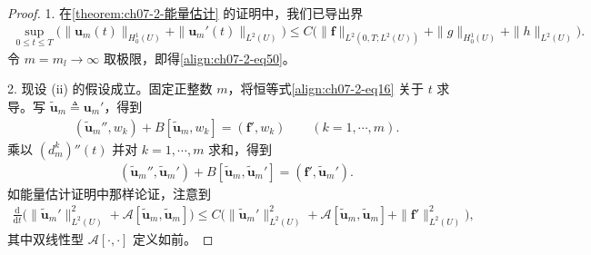 \documentclass[../../main.tex]{subfiles}
\begin{document}
\begin{proof}
1. 在\cref{theorem:ch07-2-能量估计} 的证明中，我们已导出界
\begin{align}
\sup_{0\leqslant t\leqslant T}\bigl(\|\mathbf{u}_m(t)\|_{H^1_0(U)}+\|\mathbf{u}_m'(t)\|_{L^2(U)}\bigr)
\leqslant C\bigl(\|\mathbf{f}\|_{L^2(0,T;L^2(U))}+\|g\|_{H^1_0(U)}+\|h\|_{L^2(U)}\bigr).\label{align:ch07-2-eq52}
\end{align}
令 $m=m_l\to\infty$ 取极限，即得\eqref{align:ch07-2-eq50}。

2. 现设 (ii) 的假设成立。固定正整数 $m$，将恒等式\eqref{align:ch07-2-eq16} 关于 $t$ 求导。写 $\widetilde{\mathbf{u}}_m\triangleq\mathbf{u}_m'$，得到
\begin{align}
(\widetilde{\mathbf{u}}_m'',w_k)+B[\widetilde{\mathbf{u}}_m,w_k]=(\mathbf{f}',w_k)\qquad (k=1,\cdots,m).\label{align:ch07-2-eq53}
\end{align}
乘以 $(d_m^k)''(t)$ 并对 $k=1,\cdots,m$ 求和，得到
\begin{align}
(\widetilde{\mathbf{u}}_m'',\widetilde{\mathbf{u}}_m')+B[\widetilde{\mathbf{u}}_m,\widetilde{\mathbf{u}}_m']=(\mathbf{f}',\widetilde{\mathbf{u}}_m').\label{align:ch07-2-eq54}
\end{align}
如能量估计证明中那样论证，注意到
\begin{align}
\frac{\mathrm{d}}{\mathrm{d}t}\bigl(\|\widetilde{\mathbf{u}}_m'\|_{L^2(U)}^2+\mathcal{A}[\widetilde{\mathbf{u}}_m,\widetilde{\mathbf{u}}_m]\bigr)
\leqslant C\bigl(\|\widetilde{\mathbf{u}}_m'\|_{L^2(U)}^2+\mathcal{A}[\widetilde{\mathbf{u}}_m,\widetilde{\mathbf{u}}_m]+\|\mathbf{f}'\|_{L^2(U)}^2\bigr),\label{align:ch07-2-eq55}
\end{align}
其中双线性型 $\mathcal{A}[\cdot,\cdot]$ 定义如前。


\end{proof}
\end{document}
